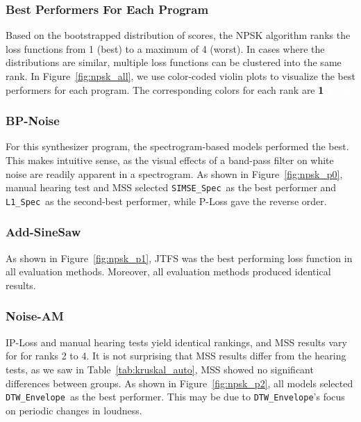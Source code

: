 \documentclass[lettersize,journal]{IEEEtran}
\newcommand{\SIMSESpec}{\texttt{SIMSE\_Spec}}
\newcommand{\LoneSpec}{\texttt{L1\_Spec}}
\newcommand{\DTWEnv}{\texttt{DTW\_Envelope}}
\newcommand{\BPNoise}{\textbf{BP-Noise}}
\newcommand{\AddSineSaw}{\textbf{Add-SineSaw}}
\newcommand{\AmpMod}{\textbf{Noise-AM}}
\begin{document}
\subsubsection{Best Performers For Each Program}
Based on the bootstrapped distribution of scores, the NPSK algorithm ranks the loss functions from 1 (best) to a maximum of 4 (worst). In cases where the distributions are similar, multiple loss functions can be clustered into the same rank. In Figure~\ref{fig:npsk_all}, we use color-coded violin plots to visualize the best performers for each program. The corresponding colors for each rank are
\colorbox{rank1}{\textcolor{black}{\textbf{1}}} \colorbox{rank2}{\textcolor{white}{\textbf{2}}} \colorbox{rank3}{\textcolor{white}{\textbf{3}}} \colorbox{rank4}{\textcolor{black}{\textcolor{white}{\textbf{4}}}}




\subsubsection{\BPNoise}
For this synthesizer program, the spectrogram-based models performed the best. This makes intuitive sense, as the visual effects of a band-pass filter on white noise are readily apparent in a spectrogram. As shown in Figure~\ref{fig:npsk_p0}, manual hearing test and MSS selected \SIMSESpec~as the best performer and \LoneSpec~as the second-best performer, while P-Loss gave the reverse order. 


\subsubsection{\AddSineSaw}
As shown in Figure~\ref{fig:npsk_p1}, JTFS was the best performing loss function in all evaluation methods. Moreover, all evaluation methods produced identical results. 

\subsubsection{\AmpMod}
IP-Loss and manual hearing tests yield identical rankings, and MSS results vary for for ranks 2 to 4. It is not surprising that MSS results differ from the hearing tests, as we saw in Table~\ref{tab:kruskal_auto}, MSS showed no significant differences between groups. As shown in Figure~\ref{fig:npsk_p2}, all models selected \DTWEnv~as the best performer. This may be due to \DTWEnv's focus on periodic changes in loudness.
\end{document}
